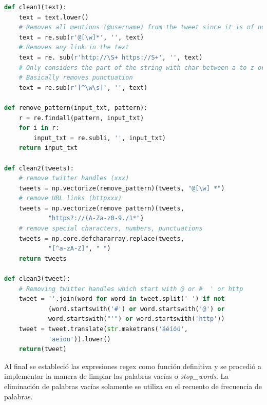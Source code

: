 \begin{lstlisting}[caption=Limpieza de las publicaciones,          label={lst:listing-python},language=Python]
def clean1(text):
    text = text.lower()
    # Removes all mentions (@username) from the tweet since it is of no use to us
    text = re.sub(r'@[\w]*', '', text)
    # Removes any link in the text
    text = re. sub(r'http://\S+ https://S+', '', text)
    # Only considers the part of the string with char between a to z or digits and whitespace characters
    # Basically removes punctuation
    text = re.sub(r'[^\w\s]', '', text)
    
def remove_pattern(input_txt, pattern):
    r = re.findall(pattern, input_txt)
    for i in r:
        input_txt = re.subli, '', input_txt)
    return input_txt
    
def clean2(tweets):
    # remove twitter handles (xxx)
    tweets = np.vectorize(remove_pattern)(tweets, "@[\w] *")
    # remove URL links (httpxxx)
    tweets = np.vectorize(remove pattern)(tweets,
            "https?://(A-Za-z0-9./1*")
    # remove special characters, numbers, punctuations
    tweets = np.core.defchararray.replace(tweets,
            "[^a-zA-Z]", " ")
    return tweets
    
def clean3(tweet):
    # Removing twitter handles which start with @ or #  ' or http
    tweet = ''.join(word for word in tweet.split(' ') if not
            (word.startswith('#') or word.startswith('@') or
            word.startswith("'") or word.startswith('http'))
    tweet = tweet.translate(str.maketrans('áéíóú',
            'aeiou')).lower()
    return(tweet)
\end{lstlisting}

Al final se estableció las expresiones regex como función definitiva y se procedió a implementar la manera de limpiar las palabras vacías o \textit{stop\_words}. La eliminación de palabras vacías solamente se utiliza en el recuento de frecuencia de palabras.

\vspace{0.3cm}

